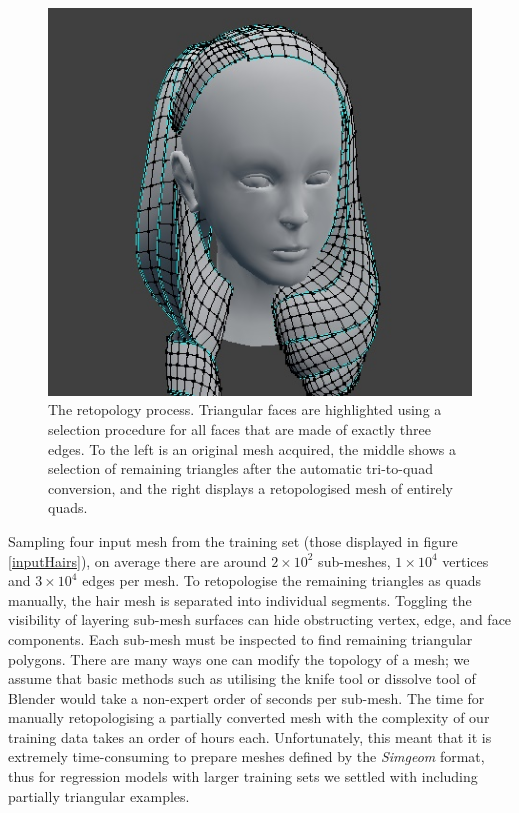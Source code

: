 \documentclass[ %
author={Dillon Keith Diep},
supervisor={Dr. Carl Henrik Ek},
degree={MEng},
title={ART-CG Hair:},
subtitle={Assisted Real-time Content Generation of Stylised Virtual Hair},
type={Research},
year={2017} ]{dissertation}
\begin{document}
\begin{figure}[!h]
	\includegraphics[scale=2]{images/triToQuad3}
	\caption{The retopology process. Triangular faces are highlighted using a selection procedure for all faces that are made of exactly three edges. To the left is an original mesh acquired, the middle shows a selection of remaining triangles after the automatic tri-to-quad conversion, and the right displays a retopologised mesh of entirely quads.}
	\label{fig:triToQuad}
\end{figure}

Sampling four input mesh from the training set (those displayed in figure \ref{inputHairs}), on average there are around $2 \times 10^{2}$ sub-meshes, $1 \times 10^{4}$ vertices and  $3 \times 10^{4}$ edges per mesh. To retopologise the remaining triangles as quads manually, the hair mesh is separated into individual segments. Toggling the visibility of layering sub-mesh surfaces can hide obstructing vertex, edge, and face components. Each sub-mesh must be inspected to find remaining triangular polygons. There are many ways one can modify the topology of a mesh; we assume that basic methods such as utilising the knife tool or dissolve tool of Blender would take a non-expert order of seconds per sub-mesh. The time for manually retopologising a partially converted mesh with the complexity of our training data takes an order of hours each. Unfortunately, this meant that it is extremely time-consuming to prepare meshes defined by the \textit{Simgeom} format, thus for regression models with larger training sets we settled with including partially triangular examples.
\end{document}
